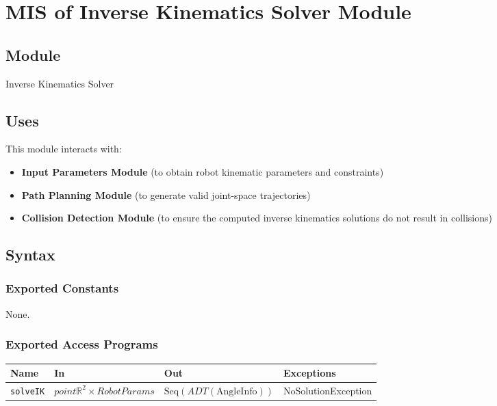 \documentclass[12pt, titlepage]{article}
\begin{document}
\newpage





\section{MIS of Inverse Kinematics Solver Module} \label{Module:InverseKinematics}

\subsection{Module}

Inverse Kinematics Solver

\subsection{Uses}

This module interacts with:
\begin{itemize}
    \item \textbf{Input Parameters Module} (to obtain robot kinematic parameters and constraints)
    \item \textbf{Path Planning Module} (to generate valid joint-space trajectories)
    \item \textbf{Collision Detection Module} (to ensure the computed inverse kinematics solutions do not result in collisions)
\end{itemize}

\subsection{Syntax}

\subsubsection{Exported Constants}

None.

\subsubsection{Exported Access Programs}

\begin{center}
  \renewcommand{\arraystretch}{1.4}
  \begin{tabular}{p{3.5cm} p{4cm} p{4cm} p{3cm}}
    \toprule
    \textbf{Name} & \textbf{In} & \textbf{Out} & \textbf{Exceptions} \\
    \midrule
    \texttt{solveIK} & $point \mathbb{R}^2 \times RobotParams$ & $\text{Seq}(ADT(\text{AngleInfo}))$ & NoSolutionException \\[4pt]

    \bottomrule
  \end{tabular}
\end{center}
\end{document}
